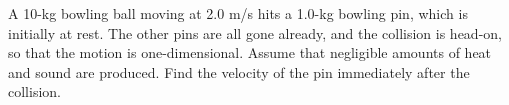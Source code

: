 A 10-kg bowling ball moving at 2.0 m/s hits a 1.0-kg
bowling pin, which is initially at rest. The other pins are
all gone already, and the collision is head-on, so that the
motion is one-dimensional. Assume that negligible amounts of
heat and sound are produced. Find the velocity of the pin
immediately after the collision.
